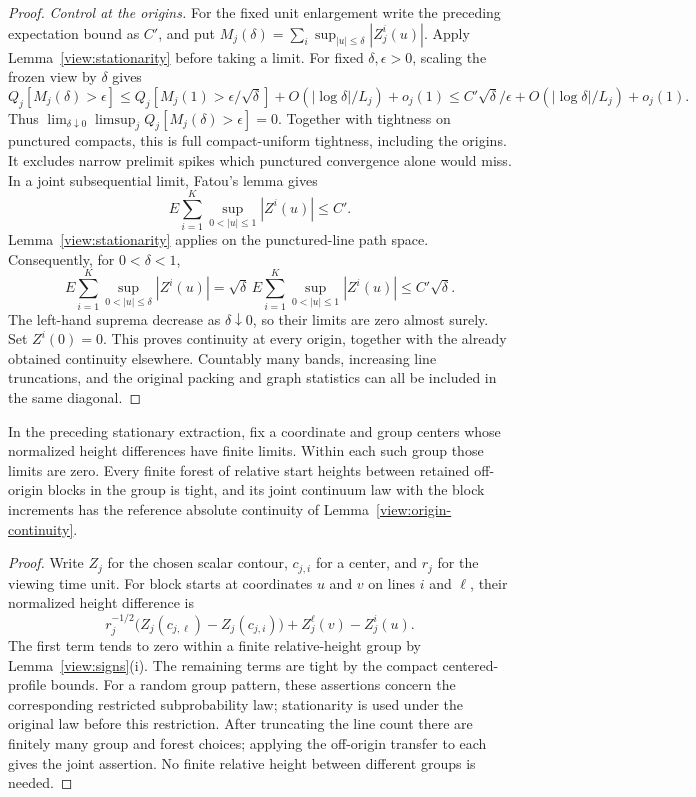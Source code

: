\begin{proof}
\smallskip\noindent\emph{Control at the origins.}
For the fixed unit enlargement write the preceding expectation bound
as $C'$, and put
$M_j(\delta)=\sum_i\sup_{|u|\le\delta}|Z_j^i(u)|$.
Apply Lemma~\ref{view:stationarity} before taking a limit.  For fixed
$\delta,\epsilon>0$, scaling the frozen view by $\delta$ gives
\[
 Q_j[M_j(\delta)>\epsilon]
 \le Q_j[M_j(1)>\epsilon/\sqrt\delta]
       +O(|\log\delta|/L_j)+o_j(1)
 \le C'\sqrt\delta/\epsilon+O(|\log\delta|/L_j)+o_j(1).
\]
Thus $\lim_{\delta\downarrow0}\limsup_j
Q_j[M_j(\delta)>\epsilon]=0$.  Together with tightness on punctured
compacts, this is full compact-uniform tightness, including the origins.
It excludes narrow prelimit spikes which punctured convergence alone
would miss.  In a joint subsequential limit, Fatou's lemma gives
\[
 E\sum_{i=1}^K\sup_{0<|u|\le1}|Z^i(u)|\le C'.
\]
Lemma~\ref{view:stationarity} applies on the punctured-line path space.
Consequently, for $0<\delta<1$,
\[
 E\sum_{i=1}^K\sup_{0<|u|\le\delta}|Z^i(u)|
 =\sqrt\delta\,E\sum_{i=1}^K\sup_{0<|u|\le1}|Z^i(u)|
 \le C'\sqrt\delta.
\]
The left-hand suprema decrease as $\delta\downarrow0$, so their limits
are zero almost surely.  Set $Z^i(0)=0$.  This proves continuity at every
origin, together with the already obtained continuity elsewhere.
Countably many bands, increasing line truncations, and the original
packing and graph statistics can all be included in the same diagonal.
\end{proof}

\begin{corollary}
\label{view:finite-shift-groups}
In the preceding stationary extraction, fix a coordinate and group
centers whose normalized height differences have finite limits.
Within each such group those limits are zero.  Every finite forest
of relative start heights between retained off-origin blocks in the
group is tight, and its joint continuum law with the block increments
has the reference absolute continuity of
Lemma~\ref{view:origin-continuity}.
\end{corollary}

\begin{proof}
Write $Z_j$ for the chosen scalar contour, $c_{j,i}$ for a center,
and $r_j$ for the viewing time unit.
For block starts at coordinates $u$ and $v$ on lines $i$ and $\ell$,
their normalized height difference is
\[
 r_j^{-1/2}\bigl(Z_j(c_{j,\ell})-Z_j(c_{j,i})\bigr)
       +Z_j^\ell(v)-Z_j^i(u).
\]
The first term tends to zero within a finite relative-height group
by Lemma~\ref{view:signs}(i).  The remaining terms are tight by the
compact centered-profile bounds.  For a random group pattern, these
assertions concern the corresponding restricted subprobability law;
stationarity is used under the original law before this restriction.
After truncating the line count
there are finitely many group and forest choices; applying the
off-origin transfer to each gives the joint assertion.  No finite
relative height between different groups is needed.
\end{proof}

